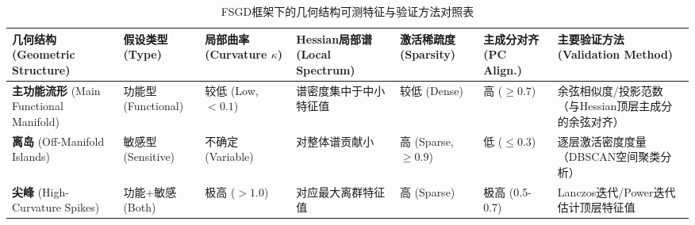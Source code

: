 \documentclass[letterpaper,twocolumn,10pt]{article}
\begin{document}
\begin{table*}[t]
\centering
\tiny
\caption{FSGD框架下的几何结构可测特征与验证方法对照表}
\begin{tabular}{@{}p{1.9cm}p{1.7cm}p{1.6cm}p{2.3cm}p{1.8cm}p{1.7cm}p{2.4cm}@{}}
\toprule
\textbf{几何结构} \newline \textbf{(Geometric Structure)} & 
\textbf{假设类型} \newline \textbf{(Type)} & 
\textbf{局部曲率} \newline \textbf{(Curvature $\kappa$)} & 
\textbf{Hessian局部谱} \newline \textbf{(Local Spectrum)} & 
\textbf{激活稀疏度} \newline \textbf{(Sparsity)} & 
\textbf{主成分对齐} \newline \textbf{(PC Align.)} & 
\textbf{主要验证方法} \newline \textbf{(Validation Method)} \\
\midrule
\textbf{主功能流形} \newline (Main Functional Manifold) & 
功能型 \newline (Functional) & 
较低 \newline (Low, $< 0.1$) & 
谱密度集中于中小特征值 & 
较低 \newline (Dense) & 
高 \newline ($\geq 0.7$) & 
余弦相似度/投影范数（与Hessian顶层主成分的余弦对齐）\\
\midrule
\textbf{离岛} \newline (Off-Manifold Islands) & 
敏感型 \newline (Sensitive) & 
不确定 \newline (Variable) & 
对整体谱贡献小 & 
高 \newline (Sparse, $\geq 0.9$) & 
低 \newline ($\leq 0.3$) & 
逐层激活密度度量（DBSCAN空间聚类分析）\\
\midrule
\textbf{尖峰} \newline (High-Curvature Spikes) & 
功能+敏感 \newline (Both) & 
极高 \newline ($> 1.0$) & 
对应最大离群特征值 & 
高 \newline (Sparse) & 
极高 \newline (0.5-0.7) & 
Lanczos迭代/Power迭代估计顶层特征值\\
\bottomrule
\end{tabular}
\label{tab:fsgd-features}
\end{table*}
\end{document}
